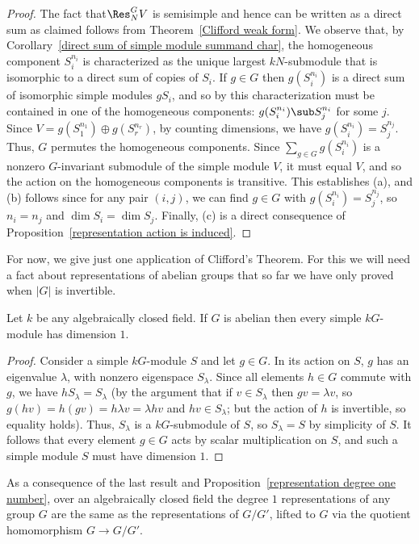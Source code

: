 \begin{proof}
The fact that$\Res^G_NV$ is semisimple and hence can be written as a direct sum as claimed follows from Theorem~\ref{Clifford weak form}. We observe that, by Corollary~\ref{direct sum of simple module summand char}, the homogeneous component $S^{n_i}_i$ is characterized as the unique largest $kN$-submodule that is isomorphic to a direct sum of copies of $S_i$. If $g\in G$ then $g(S_i^{n_i})$ is a direct sum of isomorphic simple modules $gS_i$, and so by this characterization must be contained in one of the homogeneous components: $g(S_i^{n_i})\sub S_j^{n_i}$ for some $j$. Since $V=g(S_1^{n_1})\oplus g(S_r^{n_r})$, by counting dimensions, we have $g(S_i^{n_i})=S_j^{n_j}$. Thus, $G$ permutes the homogeneous components. Since $\sum_{g\in G}g(S_i^{n_i})$ is a nonzero $G$-invariant submodule of the simple module $V$, it must equal $V$, and so the action on the homogeneous components is transitive. This establishes (a), and (b) follows since for any pair $(i,j)$, we
can find $g\in G$ with $g(S_i^{n_i})=S_j^{n_j}$, so $n_i=n_j$ and $\dim S_i=\dim S_j$. Finally, (c) is a direct consequence of Proposition~\ref{representation action is induced}.
\end{proof}
For now, we give just one application of Clifford's Theorem. For this we will need a fact about representations of abelian groups that so far we have only proved when $|G|$ is invertible.
\begin{theorem}
Let $k$ be any algebraically closed field. If $G$ is abelian then every simple $kG$-module has dimension $1$.
\end{theorem}
\begin{proof}
Consider a simple $kG$-module $S$ and let $g\in G$. In its action on $S$, $g$ has an eigenvalue $\lambda$, with nonzero eigenspace $S_\lambda$. Since all elements $h\in G$ commute with $g$, we have $hS_\lambda=S_\lambda$ (by the argument that if $v\in S_\lambda$ then $gv=\lambda v$, so $g(hv)=h(gv)=h\lambda v=\lambda hv$ and $hv\in S_\lambda$; but the action of $h$ is invertible, so equality holds). Thus, $S_\lambda$ is a $kG$-submodule of $S$, so $S_\lambda=S$ by simplicity of $S$. It follows that every element $g\in G$ acts by scalar multiplication on $S$, and such a simple module $S$ must have dimension $1$.
\end{proof}
As a consequence of the last result and Proposition~\ref{representation degree one number}, over an algebraically closed field the degree $1$ representations of any group $G$ are the same as the representations of $G/G'$, lifted to $G$ via the quotient homomorphism $G\to G/G'$.\par
